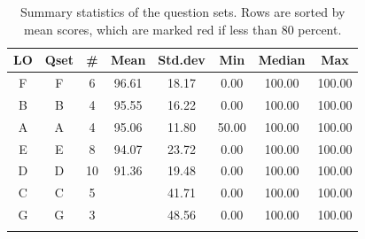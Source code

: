 \documentclass[12pt,english,nohyper]{tufte-handout}\usepackage[]{graphicx}\usepackage[]{color}
\begin{document}
\begin{fullwidth}
\makeatletter\setlength\hsize{\@tufte@fullwidth}\makeatother
\begin{longtable}{cc|ccc|ccc}
  \hline
LO & Qset & \# & Mean & Std.dev & Min & Median & Max \\ 
  \hline
F & F &   6 & 96.61 & 18.17 & 0.00 & 100.00 & 100.00 \\ 
  B & B &   4 & 95.55 & 16.22 & 0.00 & 100.00 & 100.00 \\ 
  A & A &   4 & 95.06 & 11.80 & 50.00 & 100.00 & 100.00 \\ 
  E & E &   8 & 94.07 & 23.72 & 0.00 & 100.00 & 100.00 \\ 
  D & D &  10 & 91.36 & 19.48 & 0.00 & 100.00 & 100.00 \\ 
  C & C &   5 & \color{red}{76.27} & 41.71 & 0.00 & 100.00 & 100.00 \\ 
  G & G &   3 & \color{red}{62.71} & 48.56 & 0.00 & 100.00 & 100.00 \\ 
   \hline
\hline
\caption{Summary statistics of the question sets. Rows are sorted by mean scores, which are marked red if less than 80 percent.} 
\label{tab:QuestionSet_summary}
\end{longtable}

\end{fullwidth}
\end{document}
